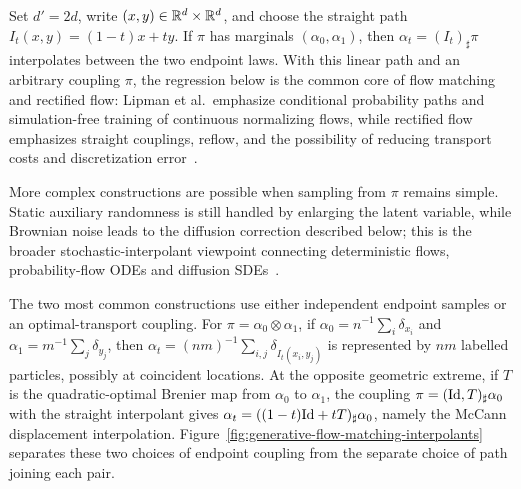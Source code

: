 \begin{example}
	Set $d'=2d$, write $(x,y)\in\mathbb{R}^d\times\mathbb{R}^d$, and choose the straight path $I_t(x,y)=(1-t)x+ty$. If $\pi$ has marginals $(\alpha_0,\alpha_1)$, then $\alpha_t=(I_t)_\sharp\pi$ interpolates between the two endpoint laws.
	With this linear path and an arbitrary coupling $\pi$, the regression below is the common core of flow matching and rectified flow: Lipman et al.\ emphasize conditional probability paths and simulation-free training of continuous normalizing flows, while rectified flow emphasizes straight couplings, reflow, and the possibility of reducing transport costs and discretization error~\citep{Lipman2022FlowMatching,Liu2023RectifiedFlow}.

	More complex constructions are possible when sampling from $\pi$ remains simple. Static auxiliary randomness is still handled by enlarging the latent variable, while Brownian noise leads to the diffusion correction described below; this is the broader stochastic-interpolant viewpoint connecting deterministic flows, probability-flow ODEs and diffusion SDEs~\citep{Albergo2025StochasticInterpolants}.
\end{example}

\begin{rem}
The two most common constructions use either independent endpoint samples or an optimal-transport coupling. For $\pi=\alpha_0\otimes\alpha_1$, if $\alpha_0=n^{-1}\sum_i\delta_{x_i}$ and $\alpha_1=m^{-1}\sum_j\delta_{y_j}$, then $\alpha_t=(nm)^{-1}\sum_{i,j}\delta_{I_t(x_i,y_j)}$ is represented by $nm$ labelled particles, possibly at coincident locations. At the opposite geometric extreme, if $T$ is the quadratic-optimal Brenier map from $\alpha_0$ to $\alpha_1$, the coupling $\pi=(\mathrm{Id},T)_\sharp\alpha_0$ with the straight interpolant gives $\alpha_t=((1-t)\mathrm{Id}+tT)_\sharp\alpha_0$, namely the McCann displacement interpolation. Figure~\ref{fig:generative-flow-matching-interpolants} separates these two choices of endpoint coupling from the separate choice of path joining each pair.
\end{rem}

